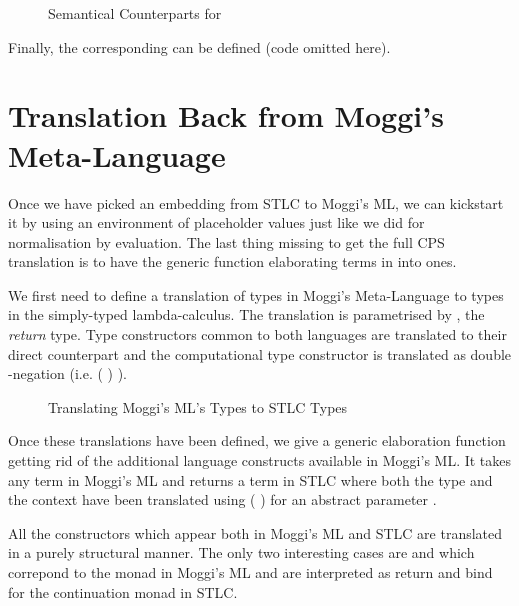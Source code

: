 \begin{figure}[h]
\caption{Semantical Counterparts for \label{fig:cbvelim}}
\end{figure}

Finally, the corresponding  can be defined (code omitted here).

\section{Translation Back from Moggi's Meta-Language}

Once we have picked an embedding from STLC to Moggi's ML, we can kickstart it by using
an environment of placeholder values just like we did for normalisation by evaluation.
The last thing missing to get the full CPS translation is to have the generic function
elaborating terms in  into  ones.

We first need to define a translation of types in Moggi's Meta-Language to types in
the simply-typed lambda-calculus. The translation is parametrised by , the
\emph{return} type. Type constructors common to both languages are translated to their
direct counterpart and the computational type constructor is translated as double
-negation (i.e. (\AB{\ensuremath{\cdot{}}}  )  ).

\begin{figure}[h]
\caption{Translating Moggi's ML's Types to STLC Types\label{fig:cpstypeml}}
\end{figure}

Once these translations have been defined, we give a generic elaboration function
getting rid of the additional language constructs available in Moggi's ML. It
takes any term in Moggi's ML and returns a term in STLC where both the type and
the context have been translated using (\AF{CPS[}  \AF{]}) for an abstract
parameter .


All the constructors which appear both in Moggi's ML and STLC are translated
in a purely structural manner. The only two interesting cases are 
and  which correpond to the \AIC{\#} monad in Moggi's ML and are
interpreted as return and bind for the continuation monad in STLC.

